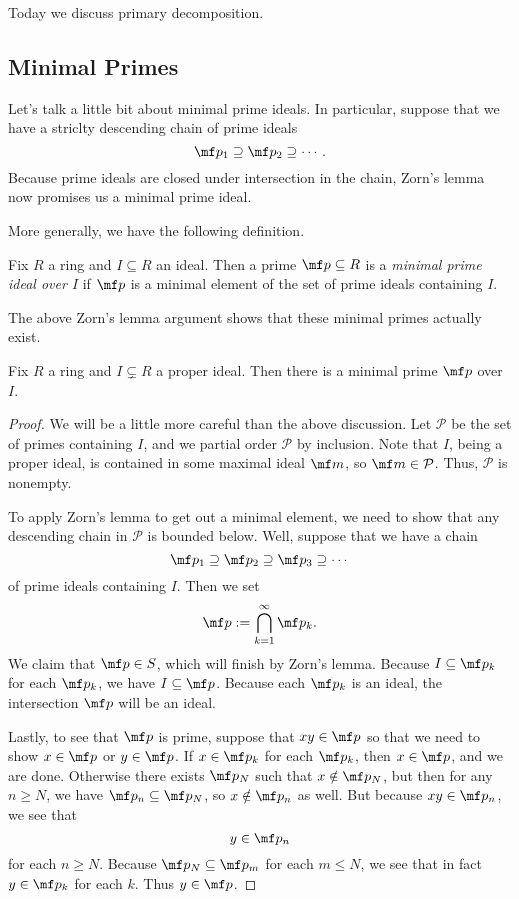 
Today we discuss primary decomposition.

\subsection{Minimal Primes}

Let's talk a little bit about minimal prime ideals. In particular, suppose that we have a striclty descending chain of prime ideals
\[\mf p_1\supseteq\mf p_2\supseteq\cdots.\]
Because prime ideals are closed under intersection in the chain, Zorn's lemma now promises us a minimal prime ideal.

More generally, we have the following definition.
\begin{definition}
	Fix $R$ a ring and $I\subseteq R$ an ideal. Then a prime $\mf p\subseteq R$ is a \textit{minimal prime ideal over $I$} if $\mf p$ is a minimal element of the set of prime ideals containing $I$.
\end{definition}
The above Zorn's lemma argument shows that these minimal primes actually exist.
\begin{proposition}
	Fix $R$ a ring and $I\subsetneq R$ a proper ideal. Then there is a minimal prime $\mf p$ over $I$.
\end{proposition}
\begin{proof}
	We will be a little more careful than the above discussion. Let $\mathcal P$ be the set of primes containing $I$, and we partial order $\mathcal P$ by inclusion. Note that $I$, being a proper ideal, is contained in some maximal ideal $\mf m$, so $\mf m\in\mathcal P$. Thus, $\mathcal P$ is nonempty.

	To apply Zorn's lemma to get out a minimal element, we need to show that any descending chain in $\mathcal P$ is bounded below. Well, suppose that we have a chain
	\[\mf p_1\supseteq\mf p_2\supseteq\mf p_3\supseteq\cdots\]
	of prime ideals containing $I$. Then we set
	\[\mf p:=\bigcap_{k=1}^\infty\mf p_k.\]
	We claim that $\mf p\in S$, which will finish by Zorn's lemma. Because $I\subseteq\mf p_k$ for each $\mf p_k$, we have $I\subseteq\mf p$. Because each $\mf p_k$ is an ideal, the intersection $\mf p$ will be an ideal.
	
	Lastly, to see that $\mf p$ is prime, suppose that $xy\in\mf p$ so that we need to show $x\in\mf p$ or $y\in\mf p$. If $x\in\mf p_k$ for each $\mf p_k$, then $x\in\mf p$, and we are done. Otherwise there exists $\mf p_N$ such that $x\notin\mf p_N$, but then for any $n\ge N$, we have $\mf p_n\subseteq\mf p_N$, so $x\notin\mf p_n$ as well. But because $xy\in\mf p_n$, we see that
	\[y\in\mf p_n\]
	for each $n\ge N$. Because $\mf p_N\subseteq\mf p_m$ for each $m\le N$, we see that in fact $y\in\mf p_k$ for each $k$. Thus $y\in\mf p$.
\end{proof}

